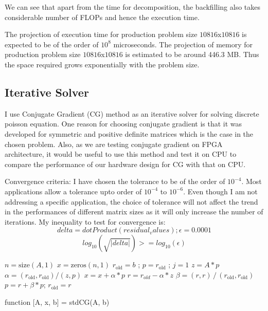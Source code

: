 \documentclass{article}
\begin{document}
\begin{spacing}{1.1}
We can see that apart from the time for decomposition, the backfilling also takes considerable number of FLOPs and hence the execution time. 

The projection of execution time for production problem size $10816$x$10816$ is expected to be of the order of $10^8$ microseconds. The projection of memory for production problem size $10816$x$10816$ is estimated to be around 446.3 MB. Thus the space required grows exponentially with the problem size.


\subsection{Iterative Solver}

I use Conjugate Gradient (CG) method as an iterative solver for solving discrete poisson equation. One reason for choosing conjugate gradient is that it was developed for symmetric and positive definite matrices which is the case in the chosen problem. Also, as we are testing conjugate gradient on FPGA architecture, it would be useful to use this method and test it on CPU to compare the performance of our hardware design for CG with that on CPU.

Convergence criteria: I have chosen the tolerance to be of the order of $10^{-4}$. Most applications allow a tolerance upto order of $10^{-4}$ to $10^{-6}$. Even though I am not addressing a specific application, the choice of tolerance will not affect the trend in the performances of different matrix sizes as it will only increase the number of iterations. My inequality to test for convergence is:
\[ delta = dotProduct(residual_values); \epsilon = 0.0001 \]
\[ log_{10}(\sqrt{|delta|}) >= log_{10}(\epsilon) \]


\begin{algorithm}[H]

\begin{algorithmic}[1]

\STATE $n = \text{size}(A,1)$ 
\STATE $x = \text{zeros}(n,1)$
\STATE $r_{\text{old}} = b$ ; $p = r_{\text{old}}$ ; $j = 1$
\STATE $z = A*p$ 
\STATE ${\alpha} = (r_{\text{old}}, r_{\text{old}})/(z, p)$
\STATE $x = x + \alpha * p$ 
\STATE $r = r_{old} - \alpha * z$
\STATE $\beta = (r, r) \, / \, (r_{\text{old}}, r_{\text{old}})$
\STATE $p = r + \beta* p$;
\STATE $r_{\text{old}} = r$
\ENDFOR
\end{algorithmic}
\caption{\label{algoCG} function [A, x, b] = stdCG(A, b)} 
\end{algorithm}


\end{spacing}
\end{document}
